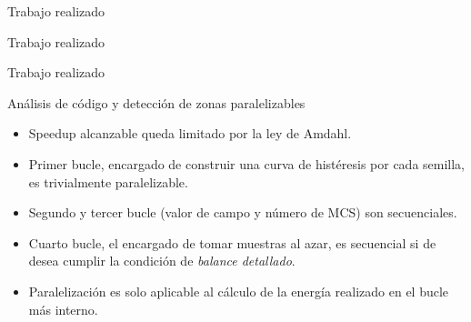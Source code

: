 \begin{frame}
\vfill
\begin{center}
\begin{block}{\begin{center}\begin{Huge}Trabajo realizado\end{Huge}\end{center}}
\end{block}
\end{center}
\end{frame}

\begin{frame}{Trabajo realizado}
\centerline{
      }
\end{frame}

\begin{frame}{Trabajo realizado}
\begin{block}{Análisis de código y detección de zonas paralelizables}
\begin{itemize}
  \item Speedup alcanzable queda limitado por la ley de Amdahl.
  \item Primer bucle, encargado de construir una curva de histéresis por cada semilla, es trivialmente paralelizable.
  \item Segundo y tercer bucle (valor de campo y número de MCS) son secuenciales.
  \item Cuarto bucle, el encargado de tomar muestras al azar, es secuencial si de desea cumplir la condición de \textit{balance detallado}.
  \item Paralelización es solo aplicable al cálculo de la energía realizado en el bucle más interno.
\end{itemize}
\end{block}

\end{frame}

